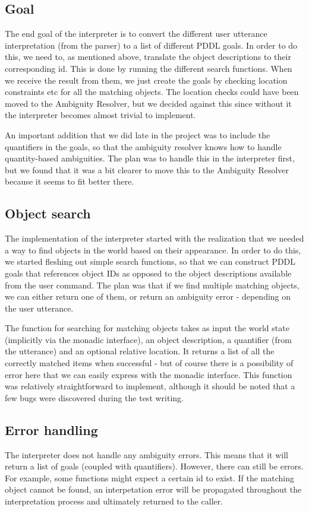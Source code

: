 \subsection*{Goal}
The end goal of the interpreter is to convert the different user utterance interpretation (from the parser) to a list of different PDDL goals.
In order to do this, we need to, as mentioned above, translate the object descriptions to their corresponding id.
This is done by running the different search functions.
When we receive the result from them, we just create the goals by checking location constraints etc for all the matching objects. The location checks could have been moved to the Ambiguity Resolver, but we decided against this since without it the interpreter becomes almost trivial to implement.

An important addition that we did late in the project was to include the quantifiers in the goals, so that the ambiguity resolver knows how to handle quantity-based ambiguities. The plan was to handle this in the interpreter first, but we found that it was a bit clearer to move this to the Ambiguity Resolver because it seems to fit better there.

\subsection*{Object search}
The implementation of the interpreter started with the realization that we needed a way to find objects in the world based on their appearance.
In order to do this, we started fleshing out simple search functions, so that we can construct PDDL goals that references object IDs as opposed to the object descriptions available from the user command.
The plan was that if we find multiple matching objects, we can either return one of them, or return an ambiguity error - depending on the user utterance.

The function for searching for matching objects takes as input the world state (implicitly via the monadic interface), an object description, a quantifier (from the utterance) and an optional relative location.
It returns a list of all the correctly matched items when successful - but of course there is a possibility of error here that we can easily express with the monadic interface.
This function was relatively straightforward to implement, although it should be noted that a few bugs were discovered during the test writing.

\subsection*{Error handling}
The interpreter does not handle any ambiguity errors.
This means that it will return a list of goals (coupled with quantifiers).
However, there can still be errors. For example, some functions might expect a certain id to exist.
If the matching object cannot be found, an interpetation error will be propagated throughout the interpretation process and ultimately returned to the caller.
